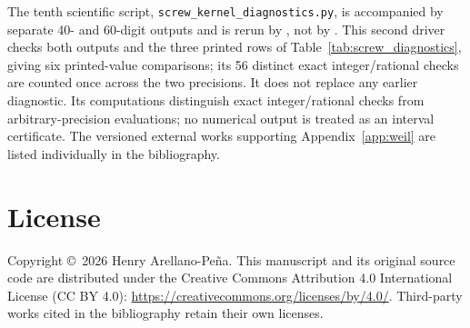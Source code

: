 \documentclass[11pt,letterpaper]{article}
\numberwithin{equation}{section}
\theoremstyle{definition}
\theoremstyle{remark}
\begin{document}
The tenth scientific script, \texttt{screw\_kernel\_diagnostics.py}, is accompanied by separate 40- and 60-digit outputs and is rerun by , not by . This second driver checks both outputs and the three printed rows of Table~\ref{tab:screw_diagnostics}, giving six printed-value comparisons; its 56 distinct exact integer/rational checks are counted once across the two precisions. It does not replace any earlier diagnostic. Its computations distinguish exact integer/rational checks from arbitrary-precision evaluations; no numerical output is treated as an interval certificate. The versioned external works supporting Appendix~\ref{app:weil} are listed individually in the bibliography.

\section*{License}
Copyright \copyright\ 2026 Henry Arellano-Pe\~na. This manuscript and its original source code are distributed under the Creative Commons Attribution 4.0 International License (CC BY 4.0): \url{https://creativecommons.org/licenses/by/4.0/}. Third-party works cited in the bibliography retain their own licenses.
\end{document}
